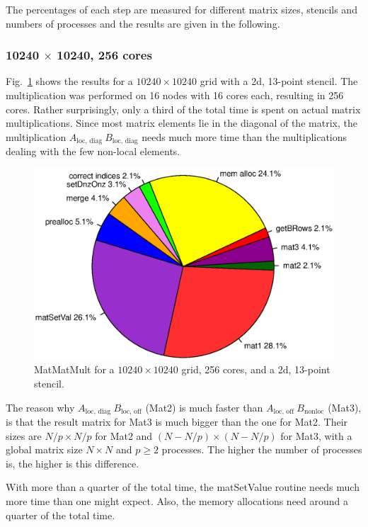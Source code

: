 The percentages of each step are measured for different matrix sizes, stencils and numbers of processes and the results are given in the following.

\subsubsection*{10240 $\times$ 10240, 256 cores}
Fig.~\ref{fig:pie_256_10240} shows the results for a $10240 \times 10240$ grid with a 2d, 13-point stencil. The multiplication was performed on 16 nodes with 16 cores each, resulting in 256 cores. Rather surprisingly, only a third of the total time is spent on actual matrix multiplications. Since most matrix elements lie in the diagonal of the matrix, the multiplication $A_{\textrm{loc, diag}}~B_{\textrm{loc, diag}}$ needs much more time than the multiplications dealing with the few non-local elements. 

\begin{figure}[tbp]
	\centering
	\includegraphics[width=1\textwidth, trim={0 3.cm 0 3cm},clip]{256cores_10240}
	\caption{MatMatMult for a $10240\times 10240$ grid, 256 cores, and a 2d, 13-point stencil.} 
	\label{fig:pie_256_10240}
\end{figure}

The reason why $A_{\textrm{loc, diag~}} B_{\textrm{loc, off}}$ (Mat2) is much faster than $A_{\textrm{loc, off~}} B_{\textrm{nonloc}}$ (Mat3), is that the result matrix for Mat3 is much bigger than the one for Mat2. Their sizes are $N/p \times N/p$ for Mat2 and $(N-N/p) \times (N-N/p)$ for Mat3, with a global matrix size $N\times N$ and $p\geq2$ processes. The higher the number of processes is, the higher is this difference.

With more than a quarter of the total time, the matSetValue routine needs much more time than one might expect. Also, the memory allocations need around a quarter of the total time. 


